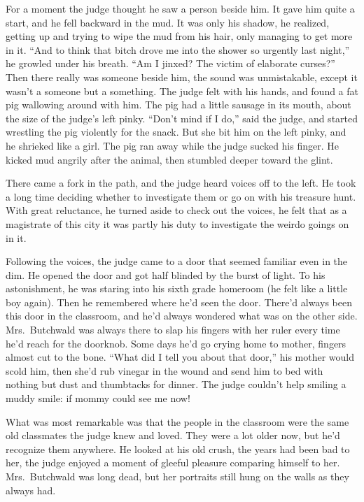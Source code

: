 \documentclass[oneside]{book}
\begin{document}
For a moment the judge thought he saw a person beside him.  It gave him quite a start,
and he fell backward in the mud.  It was only his shadow, he realized, getting up and
trying to wipe the mud from his hair, only managing to get more in it.  ``And to think
that bitch drove me into the shower so urgently last night,'' he growled under his
breath.  ``Am I jinxed?  The victim of elaborate curses?''  Then there really was
someone beside him, the sound was unmistakable, except it wasn't a someone but a something.
The judge felt with his hands, and found a fat pig wallowing around with him.
The pig had a little sausage in its mouth, about the size of the judge's left pinky.
``Don't mind if I do,'' said the judge, and started wrestling the pig violently for the snack.
But she bit him on the left pinky, and he shrieked like a girl.
The pig ran away while the judge sucked his finger.
He kicked mud angrily after the animal, then stumbled deeper toward the glint.


There came a fork in the path, and the judge heard voices off to the left.
He took a long time deciding whether to investigate them or go on with his treasure hunt.
With great reluctance, he turned aside to check out the voices, he felt that as a
magistrate of this city it was partly his duty to investigate the weirdo goings on
in it.

Following the voices, the judge came to a door that seemed familiar even in the
dim.  He opened the door and got half blinded by the burst of light.  To his astonishment,
he was staring into his sixth grade homeroom (he felt like a little boy again).
Then he remembered where he'd seen the door.
There'd always been this door in the classroom, and he'd always wondered what was on the
other side.  Mrs.~Butchwald was always there to slap his fingers with her ruler every time
he'd reach for the doorknob.  Some days he'd go crying home to mother, fingers almost cut
to the bone.  ``What did I tell you about that door,'' his mother would scold him, then 
she'd rub vinegar in the wound and send him to bed with nothing but dust and thumbtacks
for dinner.  The judge couldn't help smiling a muddy smile:  if mommy could see me now!

What was most remarkable was that the people in the classroom were the same old classmates
the judge knew and loved.  They were a lot older now, but he'd recognize them anywhere.
He looked at his old crush, the years had been bad to her, the judge enjoyed a moment of
gleeful pleasure comparing himself to her.  Mrs.~Butchwald was long dead, but her portraits
still hung on the walls as they always had.
\end{document}
